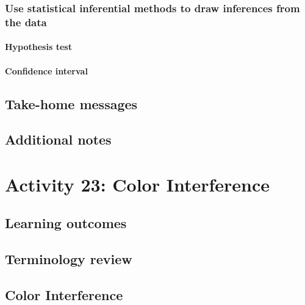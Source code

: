 \documentclass[
]{report}
\begin{document}
\subsubsection*{Use statistical inferential methods to draw inferences from the data}\label{use-statistical-inferential-methods-to-draw-inferences-from-the-data-2}

\paragraph*{Hypothesis test}\label{hypothesis-test-3}

\paragraph*{Confidence interval}\label{confidence-interval-4}

\subsection{Take-home messages}\label{take-home-messages-20}

\subsection{Additional notes}\label{additional-notes-21}

\section{Activity 23: Color Interference}\label{activity-23-color-interference}

\subsection{Learning outcomes}\label{learning-outcomes-25}

\subsection{Terminology review}\label{terminology-review-20}

\subsection{Color Interference}\label{color-interference}
\end{document}
